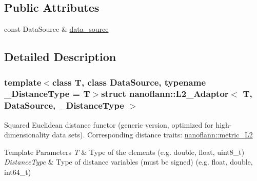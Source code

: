 \subsection*{Public Attributes}
\begin{DoxyCompactItemize}
\item 
const Data\-Source \& \hyperlink{structnanoflann_1_1_l2___adaptor_aa108fd57fd3336ea825cb62f7f5b531b}{data\-\_\-source}
\end{DoxyCompactItemize}


\subsection{Detailed Description}
\subsubsection*{template$<$class T, class Data\-Source, typename \-\_\-\-Distance\-Type = T$>$struct nanoflann\-::\-L2\-\_\-\-Adaptor$<$ T, Data\-Source, \-\_\-\-Distance\-Type $>$}

Squared Euclidean distance functor (generic version, optimized for high-\/dimensionality data sets). Corresponding distance traits\-: \hyperlink{structnanoflann_1_1metric___l2}{nanoflann\-::metric\-\_\-\-L2} 
\begin{DoxyTemplParams}{Template Parameters}
{\em T} & Type of the elements (e.\-g. double, float, uint8\-\_\-t) \\
\hline
{\em Distance\-Type} & Type of distance variables (must be signed) (e.\-g. float, double, int64\-\_\-t) \\
\hline
\end{DoxyTemplParams}


